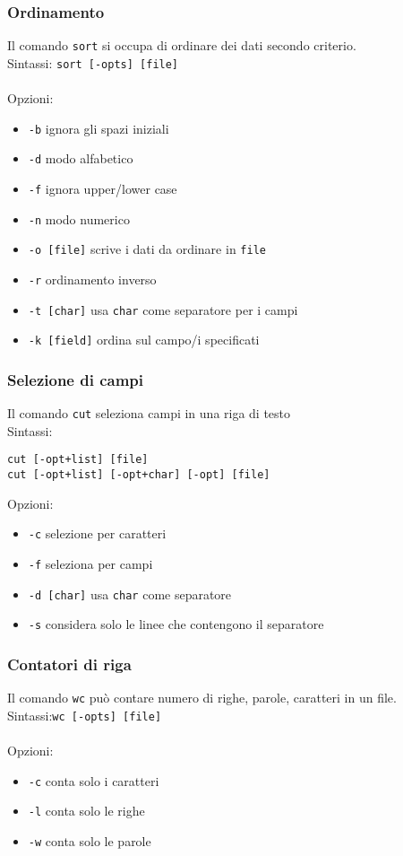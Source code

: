 \documentclass[a4paper]{article}
\begin{document}
\subsubsection{Ordinamento} Il comando \verb|sort| si occupa di ordinare dei dati secondo criterio. \\
Sintassi: \verb|sort [-opts] [file]| \\ \\
Opzioni:
\begin{itemize}
\item \verb|-b| ignora gli spazi iniziali
\item \verb|-d| modo alfabetico
\item \verb|-f| ignora upper/lower case
\item \verb|-n| modo numerico
\item \verb|-o [file]| scrive i dati da ordinare in \verb|file|
\item \verb|-r| ordinamento inverso
\item \verb|-t [char]| usa \verb|char| come separatore per i campi
\item \verb|-k [field]| ordina sul campo/i specificati
\end{itemize}

\subsubsection{Selezione di campi} Il comando \verb|cut| seleziona campi in una riga di testo \\
Sintassi:
\begin{verbatim}
cut [-opt+list] [file]
cut [-opt+list] [-opt+char] [-opt] [file]
\end{verbatim}
Opzioni:
\begin{itemize}
\item \verb|-c| selezione per caratteri
\item \verb|-f| seleziona per campi
\item \verb|-d [char]| usa \verb|char| come separatore
\item \verb|-s| considera solo le linee che contengono il separatore
\end{itemize}
\subsubsection{Contatori di riga} Il comando \verb|wc| può contare numero di righe, parole, caratteri in un file. \\
Sintassi:\verb|wc [-opts] [file]| \\ \\
Opzioni:
\begin{itemize}
\item \verb|-c| conta solo i caratteri
\item \verb|-l| conta solo le righe
\item \verb|-w| conta solo le parole
\end{itemize}
\end{document}
